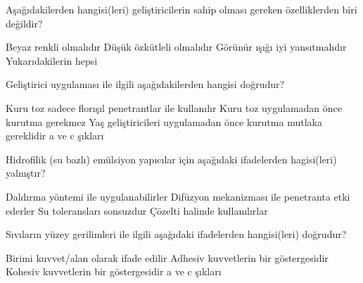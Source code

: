 \begin{question}[subtitle=]
Aşağıdakilerden hangisi(leri) geliştiricilerin sahip olması gereken özelliklerden biri değildir?
	\begin{tasks}
          \task Beyaz renkli olmalıdır
          \task Düşük özkütleli olmalıdır
          \task Görünür ışığı iyi yansıtmalıdır \correct
          \task Yukarıdakilerin hepsi
	\end{tasks}
\end{question}
\begin{solution}
	\correct
\end{solution}

\begin{question}[subtitle=]
Geliştirici uygulaması ile ilgili aşağıdakilerden hangisi doğrudur?
	\begin{tasks}
          \task Kuru toz sadece florışıl penetrantlar ile kullanılır \correct
          \task Kuru toz uygulamadan önce kurutma gerekmez
          \task Yaş geliştiricileri uygulamadan önce kurutma mutlaka gereklidir
          \task a ve c şıkları
	\end{tasks}
\end{question}
\begin{solution}
	\correct
\end{solution}

\begin{question}[subtitle=]
  Hidrofilik (su bazlı) emülsiyon yapıcılar için aşağıdaki ifadelerden hagisi(leri) yalnıştır?
	\begin{tasks}
          \task Daldırma yöntemi ile uygulanabilirler
          \task Difüzyon mekanizması ile penetranta etki ederler \correct
          \task Su toleransları sonsuzdur
          \task Çözelti halinde kullanılırlar
	\end{tasks}
\end{question}
\begin{solution}
	\correct
\end{solution}

\begin{question}[subtitle=]
  Sıvıların yüzey gerilimleri ile ilgili aşağıdaki ifadelerden hangisi(leri) doğrudur?
	\begin{tasks}
          \task Birimi kuvvet/alan olarak ifade edilir
          \task Adhesiv kuvvetlerin bir göstergesidir
          \task Kohesiv kuvvetlerin bir göstergesidir \correct
          \task a ve c şıkları
	\end{tasks}
\end{question}
\begin{solution}
	\correct
\end{solution}

